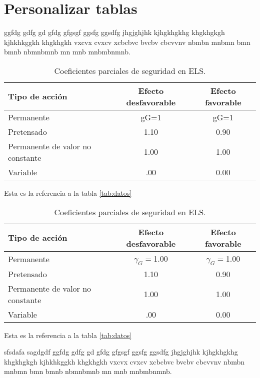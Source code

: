 \section{Personalizar tablas}

ggfdg gdfg gd gfdg gfgsgf ggsfg ggsdfg jhgjghjhk kjhgkhgkhg khgkhgkgh kjhkhkggkh khgkhgkh vxcvx cvxcv xcbcbvc bvcbv cbcvvnv nbmbn mnbmn bmn bmnb nbmnbmnb mn mnb mnbmbnmnb.

\begin{table}[h]
	\centering
	\caption{Coeficientes parciales de seguridad en ELS.}
	\begin{tabular}{p{4cm}cc}
		\hline \textbf{Tipo de acción} & \textbf{Efecto desfavorable} & \textbf{Efecto favorable} \\
		\hline Permanente & gG=1 & gG=1 \\
		\hline Pretensado & 1.10 & 0.90 \\
		\hline Permanente de valor no constante & 1.00 & 1.00 \\
		\hline Variable &.00 & 0.00 \\
		\hline
	\end{tabular}
	\label{tab:coeficientes1}
\end{table}

Esta es la referencia a la tabla \ref{tab:datos}

\begin{table}[h]
	\centering
	\caption{Coeficientes parciales de seguridad en ELS.}
	{\color{colorAzul1}
		\begin{tabular}{p{4cm}cc}
			\toprule %
			\hline \textbf{Tipo de acción} & \textbf{Efecto desfavorable} & \textbf{Efecto favorable} \\
			\midrule %
			Permanente & $ \gamma_G= $1.00 & $ \gamma_G= $1.00 \\
			Pretensado & 1.10 & 0.90 \\
			Permanente de valor no constante & 1.00 & 1.00 \\
			Variable &.00 & 0.00 \\
			\bottomrule %
	\end{tabular}}
	\label{tab:coeficientes2}
\end{table}

Esta es la referencia a la tabla \ref{tab:datos}


sfsdafa sagdgdf ggfdg gdfg gd gfdg gfgsgf ggsfg ggsdfg jhgjghjhk kjhgkhgkhg khgkhgkgh kjhkhkggkh khgkhgkh vxcvx cvxcv xcbcbvc bvcbv cbcvvnv nbmbn mnbmn bmn bmnb nbmnbmnb mn mnb mnbmbnmnb.


